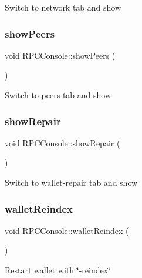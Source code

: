 Switch to network tab and show \mbox{\label{class_r_p_c_console_a95e38366e41ff43dea094b1c5ff4d340}} 
\subsubsection{\texorpdfstring{showPeers}{showPeers}}
{\footnotesize\ttfamily void R\+P\+C\+Console\+::show\+Peers (\begin{DoxyParamCaption}{ }\end{DoxyParamCaption})\hspace{0.3cm}{\ttfamily [slot]}}

Switch to peers tab and show \mbox{\label{class_r_p_c_console_a778d71231f31de641e70702b341ded04}} 
\subsubsection{\texorpdfstring{showRepair}{showRepair}}
{\footnotesize\ttfamily void R\+P\+C\+Console\+::show\+Repair (\begin{DoxyParamCaption}{ }\end{DoxyParamCaption})\hspace{0.3cm}{\ttfamily [slot]}}

Switch to wallet-\/repair tab and show \mbox{\label{class_r_p_c_console_ac0e0d64fc96a4621dcb8006eafbb3bc5}} 
\subsubsection{\texorpdfstring{walletReindex}{walletReindex}}
{\footnotesize\ttfamily void R\+P\+C\+Console\+::wallet\+Reindex (\begin{DoxyParamCaption}{ }\end{DoxyParamCaption})\hspace{0.3cm}{\ttfamily [slot]}}

Restart wallet with \char`\"{}-\/reindex\char`\"{} \mbox{\label{class_r_p_c_console_a87bca6ab058743cda3d716543071ce03}} 
